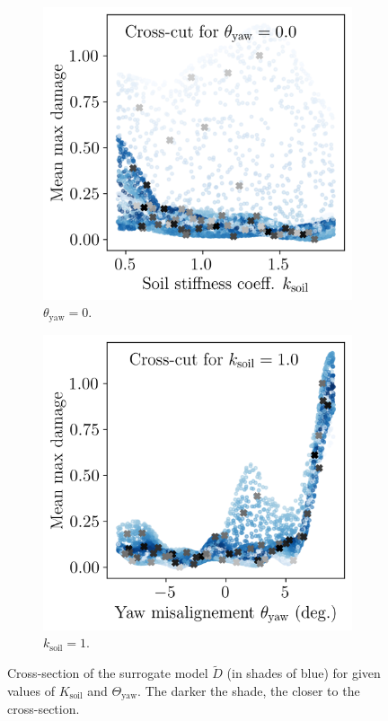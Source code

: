 \begin{figure}[h!]
    \centering
    \begin{subfigure}[b]{0.38\linewidth}
        \includegraphics[width=\linewidth]{./part3/figures/OWT/dam_vs_soil_surrogate.png}
        \caption{$\theta_{\mathrm{yaw}}=0$.}
    \end{subfigure}
    \begin{subfigure}[b]{0.38\linewidth}
        \includegraphics[width=\linewidth]{./part3/figures/OWT/dam_vs_yaw_surrogate.png}
        \caption{$k_{\mathrm{soil}}=1$.}
    \end{subfigure}
    \caption{Cross-section of the surrogate model $\widetilde{D}$ (in shades of blue) for given values of $K_{\mathrm{soil}}$ and $\Theta_{\mathrm{yaw}}$. The darker the shade, the closer to the cross-section.}
    \label{fig:owt_surrogate}
\end{figure}

